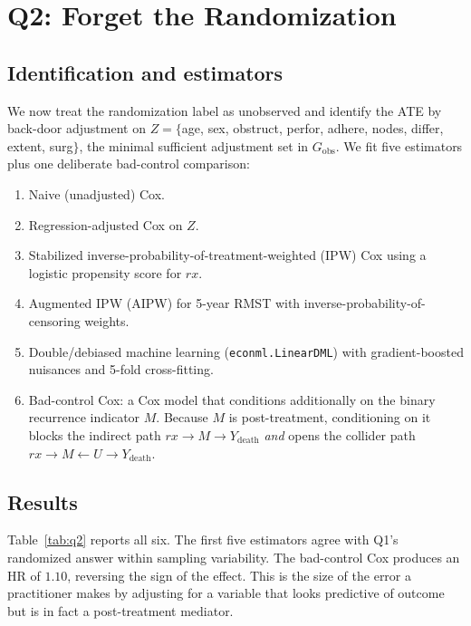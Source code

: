 \documentclass[conference]{IEEEtran}
\begin{document}
\section{Q2: Forget the Randomization}

\subsection{Identification and estimators}

We now treat the randomization label as unobserved and identify the ATE by back-door adjustment on $Z = \{$age, sex, obstruct, perfor, adhere, nodes, differ, extent, surg$\}$, the minimal sufficient adjustment set in $G_\text{obs}$. We fit five estimators plus one deliberate bad-control comparison:
\begin{enumerate}
    \item Naive (unadjusted) Cox.
    \item Regression-adjusted Cox on $Z$.
    \item Stabilized inverse-probability-of-treatment-weighted (IPW) Cox using a logistic propensity score for $rx$.
    \item Augmented IPW (AIPW) for 5-year RMST with inverse-probability-of-censoring weights.
    \item Double/debiased machine learning (\texttt{econml.LinearDML}) with gradient-boosted nuisances and 5-fold cross-fitting.
    \item Bad-control Cox: a Cox model that conditions additionally on the binary recurrence indicator $M$. Because $M$ is post-treatment, conditioning on it blocks the indirect path $rx \to M \to Y_\text{death}$ \emph{and} opens the collider path $rx \to M \leftarrow U \to Y_\text{death}$.
\end{enumerate}

\subsection{Results}

Table~\ref{tab:q2} reports all six. The first five estimators agree with Q1's randomized answer within sampling variability. The bad-control Cox produces an HR of $1.10$, reversing the sign of the effect. This is the size of the error a practitioner makes by adjusting for a variable that looks predictive of outcome but is in fact a post-treatment mediator.
\end{document}
